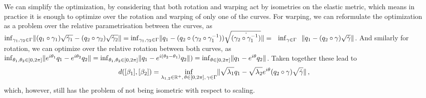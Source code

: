 We can simplify the optimization, by considering that both rotation and warping act by isometries on the elastic metric, which means in practice it is enough to optimize over the rotation and warping of only one of the curves.
For warping, we can reformulate the optimization as a problem over the relative parametrisation between the curves, as $\inf_{\gamma_1,\gamma_2 \in \Gamma} \lVert(q_1 \circ \gamma_1) \sqrt{\dot\gamma_1} - (q_2 \circ \gamma_2) \sqrt{\dot\gamma_2}\rVert = \inf_{\gamma_1,\gamma_2 \in \Gamma} \lVert q_1 - (q_2 \circ (\gamma_2 \circ \gamma_1^{-1})) \sqrt{\dot{(\gamma_2 \circ \gamma_1^{-1})}}\rVert= \,\,\,\,\inf_{\gamma \in \Gamma} \,\,\,\, \lVert q_1 - (q_2 \circ \gamma) \sqrt{\dot\gamma}\rVert$.
And smilarly for rotation, we can optimize over the relative rotation between both curves, as
$\inf_{\theta_1,\theta_2 \in [0,2\pi]} \lVert e^{i\theta_1}q_1 - e^{i\theta_2}q_2\rVert = \inf_{\theta_1, \theta_2 \in [0,2\pi]} \lVert q_1 - e^{i(\theta_2 - \theta_1)}q_2\rVert ) = \inf_{\theta \in [0,2\pi]} \lVert q_1 - e^{i\theta}q_2\rVert$.
Taken together these lead to
$$d([\beta_1], [\beta_2]) = 
  \inf_{\lambda_{1,2} \in \mathbb{R}^+,\,\theta \in [0,2\pi],\, \gamma \in \Gamma} \lVert \sqrt{\lambda_1}q_1 - \sqrt{\lambda_2} e^{i\theta}(q_2 \circ \gamma) \sqrt{\dot\gamma}\rVert\,,$$
which, however, still has the problem of not being  isometric with respect to scaling.

